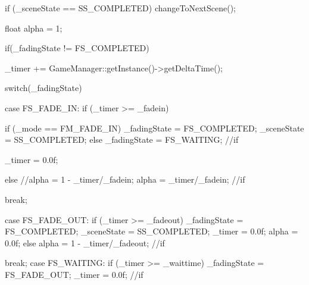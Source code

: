 \begin{DoxyCode}
{
        if (_sceneState == SS_COMPLETED)
        {
                changeToNextScene();
        }

        float alpha = 1;

        if(_fadingState != FS_COMPLETED)
        {
                _timer += GameManager::getInstance()->getDeltaTime();

                switch(_fadingState)
                {
                        case FS_FADE_IN:
                                if (_timer >= _fadein)
                                {
                                        if (_mode == FM_FADE_IN)
                                        {
                                                _fadingState = FS_COMPLETED;
                                                _sceneState = SS_COMPLETED;
                                        } 
                                        else
                                        {
                                                _fadingState = FS_WAITING;
                                        }//if

                                        _timer = 0.0f;
                                }
                                else
                                {
                                        //alpha = 1 - _timer/_fadein;
                                        alpha = _timer/_fadein;
                                }//if

                                break;

                        case FS_FADE_OUT:
                                if (_timer >= _fadeout)
                                {
                                        _fadingState = FS_COMPLETED;
                                        _sceneState = SS_COMPLETED;
                                        _timer = 0.0f;
                                        alpha = 0.0f;
                                }
                                else
                                {
                                        alpha = 1 - _timer/_fadeout;
                                }//if

                                break;
                        case FS_WAITING:
                                if (_timer >= _waittime)
                                {
                                        _fadingState = FS_FADE_OUT;
                                        _timer = 0.0f;
                                }//if

}}}
\end{DoxyCode}
